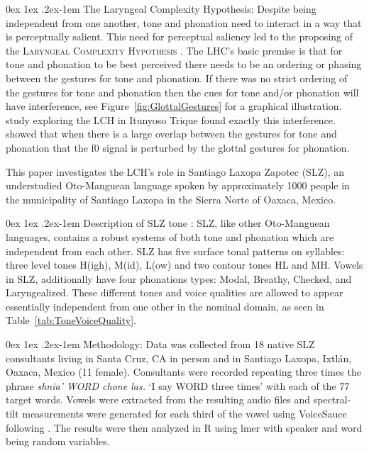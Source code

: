 \documentclass[12pt, letterpaper]{article}
\makeatletter
\renewcommand{\paragraph}{%
  \@startsection{paragraph}{4}%
  {\z@}{0ex \@plus 1ex \@minus .2ex}{-1em}%
  {\normalfont\normalsize\bfseries}%
}
\makeatother
\begin{document}
\paragraph{The Laryngeal Complexity Hypothesis:} Despite being independent from one another, tone and phonation need to interact in a way that is perceptually salient. This need for perceptual saliency led to the proposing of the \textsc{Laryngeal Complexity Hypothesis} \citep[LCH;][]{silvermanLaryngealComplexityOtomanguean1997,blankenshipTimeCourseBreathiness1997,blankenshipTimingNonmodalPhonation2002}. The LHC's basic premise is that for tone and phonation to be best perceived there needs to be an ordering or phasing between the gestures for tone and phonation. If there was no strict ordering of the gestures for tone and phonation then the cues for tone and/or phonation will have interference, see Figure~\ref{fig:GlottalGestures} for a graphical illustration.  study exploring the LCH in Itunyoso Trique found exactly this interference. \citeauthor{dicanioCoarticulationToneGlottal2012} showed that when there is a large overlap between the gestures for tone and phonation that the f0 signal is perturbed by the glottal gestures for phonation. 

This paper investigates the LCH's role in Santiago Laxopa Zapotec (SLZ), an understudied Oto-Manguean language spoken by approximately 1000 people in the municipality of Santiago Laxopa in the Sierra Norte of Oaxaca, Mexico. 

\paragraph{Description of SLZ tone :} 
SLZ, like other Oto-Manguean languages, contains a robust systems of both tone and phonation which are independent from each other. SLZ has five surface tonal patterns on syllables: three level tones H(igh), M(id), L(ow) and two contour tones HL and MH. Vowels in SLZ, additionally have four phonations types: Modal, Breathy, Checked, and Laryngealized. 
These different tones and voice qualities are allowed to appear essentially independent from one other in the nominal domain, as seen in Table~\ref{tab:ToneVoiceQuality}.

\paragraph{Methodology:} 
Data was collected from 18 native SLZ consultants living in Santa Cruz, CA in person and in Santiago Laxopa, Ixtlán, Oaxaca, Mexico (11 female).  
Consultants were recorded repeating three times the phrase \textit{shnia' WORD chone las.} `I say WORD three times' with each of the 77 target words.
Vowels were extracted from the resulting audio files and spectral-tilt measurements were generated for each third of the vowel using VoiceSauce \citep{shueVOICESAUCEProgramVoice2009} following \citet{garellekAcousticConsequencesPhonation2011}. The results were then analyzed in R \citep{rcoreteamLanguageEnvironmentStatistical2021} using lmer with speaker and word being random variables. 
\end{document}
